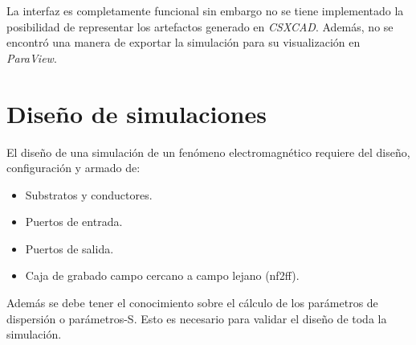 \documentclass[
    11pt,
    spanish,
    a4paper
]{article}
\begin{document}
La interfaz es completamente funcional sin embargo no se tiene implementado la posibilidad de representar los artefactos generado en \emph{CSXCAD}.
Además, no se encontró una manera de exportar la simulación para su visualización en \emph{ParaView}.

\section*{Diseño de simulaciones}

El diseño de una simulación de un fenómeno electromagnético requiere del diseño, configuración y armado de:

\begin{itemize}
\item Substratos y conductores.
\item Puertos de entrada.
\item Puertos de salida.
\item Caja de grabado campo cercano a campo lejano (nf2ff).
\end{itemize}

Además se debe tener el conocimiento sobre el cálculo de los parámetros de dispersión o parámetros-S.
Esto es necesario para validar el diseño de toda la simulación.
\end{document}
